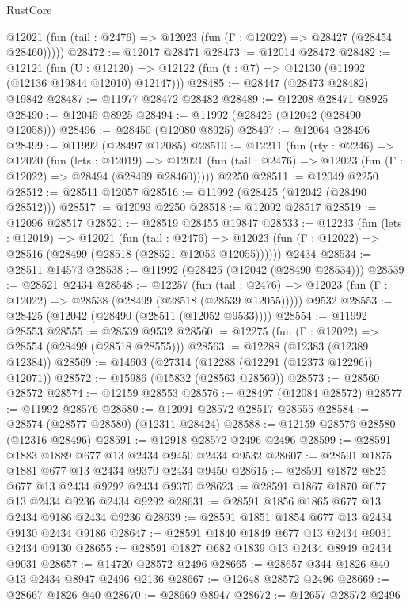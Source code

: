 \begin{lexlean}{RustCore}
\begin{coremodule}
      @12021 (fun (tail : @2476) => @12023 (fun (Γ : @12022) => @28427 (@28454 @28460)))))
@28472 := @12017 @28471
@28473 := @12014 @28472
@28482 := @12121
    (fun (U : @12120) => @12122 (fun (t : @7) => @12130 (@11992 (@12136 @19844 @12010) @12147)))
@28485 := @28447 (@28473 @28482) @19842
@28487 := @11977 @28472 @28482
@28489 := @12208 @28471 @8925
@28490 := @12045 @8925
@28494 := @11992 (@28425 (@12042 (@28490 @12058)))
@28496 := @28450 (@12080 @8925)
@28497 := @12064 @28496
@28499 := @11992 (@28497 @12085)
@28510 := @12211
    (fun (rty : @2246) =>
    @12020
      (fun (lets : @12019) =>
      @12021 (fun (tail : @2476) => @12023 (fun (Γ : @12022) => @28494 (@28499 @28460)))))
    @2250
@28511 := @12049 @2250
@28512 := @28511 @12057
@28516 := @11992 (@28425 (@12042 (@28490 @28512)))
@28517 := @12093 @2250
@28518 := @12092 @28517
@28519 := @12096 @28517
@28521 := @28519 @28455 @19847
@28533 := @12233
    (fun (lets : @12019) =>
    @12021
      (fun (tail : @2476) =>
      @12023 (fun (Γ : @12022) => @28516 (@28499 (@28518 (@28521 @12053 @12055))))))
    @2434
@28534 := @28511 @14573
@28538 := @11992 (@28425 (@12042 (@28490 @28534)))
@28539 := @28521 @2434
@28548 := @12257
    (fun (tail : @2476) => @12023 (fun (Γ : @12022) => @28538 (@28499 (@28518 (@28539 @12055)))))
    @9532
@28553 := @28425 (@12042 (@28490 (@28511 (@12052 @9533))))
@28554 := @11992 @28553
@28555 := @28539 @9532
@28560 := @12275 (fun (Γ : @12022) => @28554 (@28499 (@28518 @28555)))
@28563 := @12288 (@12383 (@12389 @12384))
@28569 := @14603 (@27314 (@12288 (@12291 (@12373 @12296)) @12071))
@28572 := @15986 (@15832 (@28563 @28569))
@28573 := @28560 @28572
@28574 := @12159 @28553
@28576 := @28497 (@12084 @28572)
@28577 := @11992 @28576
@28580 := @12091 @28572 @28517 @28555
@28584 := @28574 (@28577 @28580) (@12311 @28424)
@28588 := @12159 @28576 @28580 (@12316 @28496)
@28591 := @12918 @28572 @2496 @2496
@28599 := @28591 @1883 @1889 @677 @13 @2434 @9450 @2434 @9532
@28607 := @28591 @1875 @1881 @677 @13 @2434 @9370 @2434 @9450
@28615 := @28591 @1872 @825 @677 @13 @2434 @9292 @2434 @9370
@28623 := @28591 @1867 @1870 @677 @13 @2434 @9236 @2434 @9292
@28631 := @28591 @1856 @1865 @677 @13 @2434 @9186 @2434 @9236
@28639 := @28591 @1851 @1854 @677 @13 @2434 @9130 @2434 @9186
@28647 := @28591 @1840 @1849 @677 @13 @2434 @9031 @2434 @9130
@28655 := @28591 @1827 @682 @1839 @13 @2434 @8949 @2434 @9031
@28657 := @14720 @28572 @2496
@28665 := @28657 @344 @1826 @40 @13 @2434 @8947 @2496 @2136
@28667 := @12648 @28572 @2496
@28669 := @28667 @1826 @40
@28670 := @28669 @8947
@28672 := @12657 @28572 @2496

\end{coremodule}
\end{lexlean}
